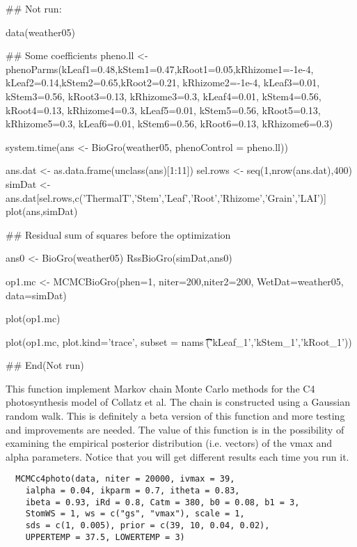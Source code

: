 \documentclass[letterpaper]{book}
\begin{document}
%
\begin{Examples}
\begin{ExampleCode}
## Not run: 

data(weather05)

## Some coefficients
pheno.ll <- phenoParms(kLeaf1=0.48,kStem1=0.47,kRoot1=0.05,kRhizome1=-1e-4,
                       kLeaf2=0.14,kStem2=0.65,kRoot2=0.21, kRhizome2=-1e-4,
                       kLeaf3=0.01, kStem3=0.56, kRoot3=0.13, kRhizome3=0.3,
                       kLeaf4=0.01, kStem4=0.56, kRoot4=0.13, kRhizome4=0.3,
                       kLeaf5=0.01, kStem5=0.56, kRoot5=0.13, kRhizome5=0.3,
                       kLeaf6=0.01, kStem6=0.56, kRoot6=0.13, kRhizome6=0.3)

system.time(ans <- BioGro(weather05, phenoControl = pheno.ll))

ans.dat <- as.data.frame(unclass(ans)[1:11])
sel.rows <- seq(1,nrow(ans.dat),400)
simDat <- ans.dat[sel.rows,c('ThermalT','Stem','Leaf','Root','Rhizome','Grain','LAI')]
plot(ans,simDat)

## Residual sum of squares before the optimization

ans0 <- BioGro(weather05)
RssBioGro(simDat,ans0)


op1.mc <- MCMCBioGro(phen=1, niter=200,niter2=200,
                     WetDat=weather05,
                     data=simDat)


plot(op1.mc)

plot(op1.mc, plot.kind='trace', subset = nams %
\t\t\t\tc('kLeaf_1','kStem_1','kRoot_1'))


## End(Not run)
\end{ExampleCode}
\end{Examples}
%
\begin{Description}\relax
This function implement Markov chain Monte Carlo methods
for the C4 photosynthesis model of Collatz et al.  The
chain is constructed using a Gaussian random walk. This
is definitely a beta version of this function and more
testing and improvements are needed. The value of this
function is in the possibility of examining the empirical
posterior distribution (i.e. vectors) of the vmax and
alpha parameters.  Notice that you will get different
results each time you run it.
\end{Description}
%
\begin{Usage}
\begin{verbatim}
  MCMCc4photo(data, niter = 20000, ivmax = 39,
    ialpha = 0.04, ikparm = 0.7, itheta = 0.83,
    ibeta = 0.93, iRd = 0.8, Catm = 380, b0 = 0.08, b1 = 3,
    StomWS = 1, ws = c("gs", "vmax"), scale = 1,
    sds = c(1, 0.005), prior = c(39, 10, 0.04, 0.02),
    UPPERTEMP = 37.5, LOWERTEMP = 3)
\end{verbatim}
\end{Usage}
\end{document}

